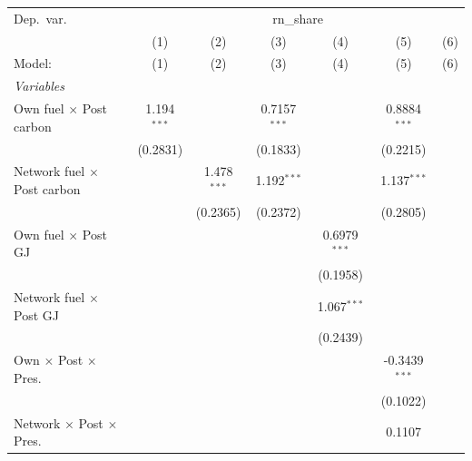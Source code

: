 \begingroup
\centering
\begin{tabular}{lcccccc}
   \tabularnewline \midrule \midrule
   Dep.\ var. & \multicolumn{6}{c}{rn\_share}\\
                                                & (1)           & (2)           & (3)            & (4)            & (5)             & (6) \\   
   Model:                                       & (1)           & (2)           & (3)            & (4)            & (5)             & (6)\\  
   \midrule
   \emph{Variables}\\
   Own fuel $\times$ Post carbon                & 1.194$^{***}$ &               & 0.7157$^{***}$ &                & 0.8884$^{***}$  &   \\   
                                                & (0.2831)      &               & (0.1833)       &                & (0.2215)        &   \\   
   Network fuel $\times$ Post carbon            &               & 1.478$^{***}$ & 1.192$^{***}$  &                & 1.137$^{***}$   &   \\   
                                                &               & (0.2365)      & (0.2372)       &                & (0.2805)        &   \\   
   Own fuel $\times$ Post GJ                    &               &               &                & 0.6979$^{***}$ &                 &   \\   
                                                &               &               &                & (0.1958)       &                 &   \\   
   Network fuel $\times$ Post GJ                &               &               &                & 1.067$^{***}$  &                 &   \\   
                                                &               &               &                & (0.2439)       &                 &   \\   
   Own $\times$ Post $\times$ Pres.             &               &               &                &                & -0.3439$^{***}$ &   \\   
                                                &               &               &                &                & (0.1022)        &   \\   
   Network $\times$ Post $\times$ Pres.         &               &               &                &                & 0.1107          &   \\   

\end{tabular}
